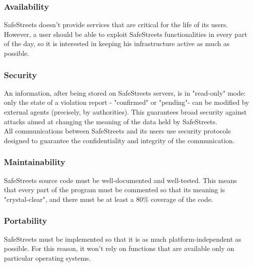 \documentclass{article}
\begin{document}
			\subsubsection{Availability}
			SafeStreets doesn't provide services that are critical for the life of its users. However, a user should be able to exploit SafeStreets functionalities in every part of the day, so it is interested in keeping his infrastructure active as much as possible.
			
			\subsubsection{Security}
			An information, after being stored on SafeStreets servers, is in "read-only" mode: only the state of a violation report - "confirmed" or "pending"- can be modified by external agents (precisely, by authorities). This guarantees broad security against attacks aimed at changing the meaning of the data held by SafeStreets.\\
			All communications between SafeStreets and its users use security protocols designed to guarantee the confidentiality and integrity of the communication.
			
			\subsubsection{Maintainability}
			SafeStreets source code must be well-documented and well-tested. This means that every part of the program must be commented so that its meaning is "crystal-clear", and there must be at least a 80\% coverage of the code.
			
			\subsubsection{Portability}
			SafeStreets must be implemented so that it is as much platform-independent as possible. For this reason, it won't rely on functions that are available only on particular operating systems.
	
\end{document}
